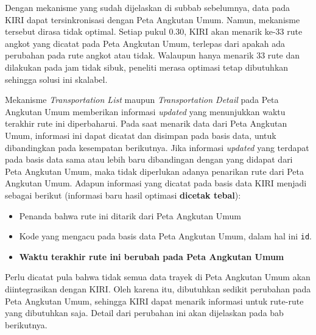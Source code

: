 Dengan mekanisme yang sudah dijelaskan di subbab sebelumnya, data pada KIRI dapat tersinkronisasi dengan Peta Angkutan Umum. Namun, mekanisme tersebut dirasa tidak optimal. Setiap pukul 0.30, KIRI akan menarik ke-33 rute angkot yang dicatat pada Peta Angkutan Umum, terlepas dari apakah ada perubahan pada rute angkot atau tidak. Walaupun hanya menarik 33 rute dan dilakukan pada jam tidak sibuk, peneliti merasa optimasi tetap dibutuhkan sehingga solusi ini skalabel.

Mekanisme \textit{Transportation List} maupun \textit{Transportation Detail} pada Peta Angkutan Umum memberikan informasi \textit{updated} yang menunjukkan waktu terakhir rute ini diperbaharui. Pada saat menarik data dari Peta Angkutan Umum, informasi ini dapat dicatat dan disimpan pada basis data, untuk dibandingkan pada kesempatan berikutnya. Jika informasi \textit{updated} yang terdapat pada basis data sama atau lebih baru dibandingan dengan yang didapat dari Peta Angkutan Umum, maka tidak diperlukan adanya penarikan rute dari Peta Angkutan Umum. Adapun informasi yang dicatat pada basis data KIRI menjadi sebagai berikut (informasi baru hasil optimasi \textbf{dicetak tebal}):

\begin{itemize}
	\item Penanda bahwa rute ini ditarik dari Peta Angkutan Umum
	\item Kode yang mengacu pada basis data Peta Angkutan Umum, dalam hal ini \texttt{id}.
	\item \textbf{Waktu terakhir rute ini berubah pada Peta Angkutan Umum}
\end{itemize}

Perlu dicatat pula bahwa tidak semua data trayek di Peta Angkutan Umum akan diintegrasikan dengan KIRI. Oleh karena itu, dibutuhkan sedikit perubahan pada Peta Angkutan Umum, sehingga KIRI dapat menarik informasi untuk rute-rute yang dibutuhkan saja. Detail dari perubahan ini akan dijelaskan pada bab berikutnya.
